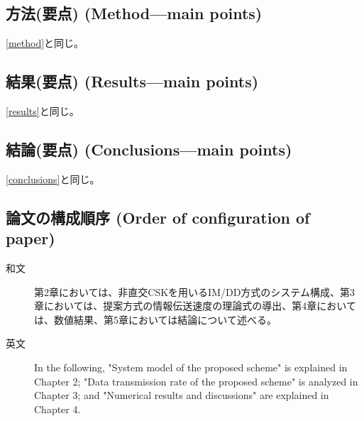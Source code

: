 ﻿\documentclass[a4j,10pt]{jarticle}
\begin{document}
\subsection{方法(要点) (Method---main points)}
\ref{method}と同じ。
%
\subsection{結果(要点) (Results---main points)}
\ref{results}と同じ。
%
\subsection{結論(要点) (Conclusions---main points)}
\ref{conclusions}と同じ。
%
\subsection{論文の構成順序 (Order of configuration of paper)}
\begin{description}
 \item[和文] 
第2章においては、非直交CSKを用いるIM/DD方式のシステム構成、第3章においては、提案方式の情報伝送速度の理論式の導出、第4章においては、数値結果、第5章においては結論について述べる。
 \item[英文] In the following, "System model of the proposed scheme" is explained in Chapter 2; "Data transmission rate of the proposed scheme" is analyzed in Chapter 3; and "Numerical results and discussions" are explained in Chapter 4. 
\end{description}
%
\end{document}
